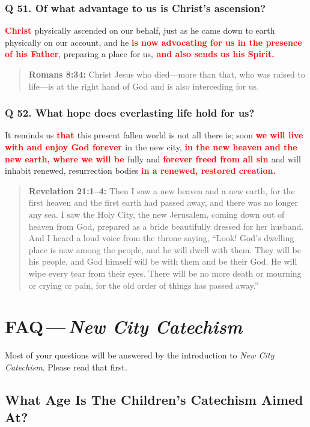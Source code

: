 \documentclass[titlepage]{memoir}
\newcommand\Children[1]{\textbf{\textcolor{red}{#1}}}
\newcommand\Quote[2]{\begin{quote}{\small\textbf{#1:}{ #2}}\end{quote}}
\begin{document}
\subsection{Q 51. Of what advantage to us is Christ's ascension?}
\Children{Christ }physically ascended on our behalf, just as he came down to earth physically on our account, and he \Children{is now advocating for us in the presence of his Father}, preparing a place for us,\Children{ and also sends us his Spirit.}

\Quote{Romans 8:34}{Christ Jesus who died\thinspace{}---\thinspace{}more than that, who was raised to life\thinspace{}---\thinspace{}is at the right hand of God and is also interceding for us.}

\subsection{Q 52. What hope does everlasting life hold for us?}
It reminds us \Children{that }this present fallen world is not all there is; soon \Children{we will live with and enjoy God forever }in the new city, \Children{in the new heaven and the new earth, where we will be }fully and \Children{forever freed from all sin }and will inhabit renewed, resurrection bodies \Children{in a renewed, restored creation.}

\Quote{Revelation 21:1--4}{Then I saw a new heaven and a new earth, for the first heaven and the first earth had passed away, and there was no longer any sea. I saw the Holy City, the new Jerusalem, coming down out of heaven from God, prepared as a bride beautifully dressed for her husband. And I heard a loud voice from the throne saying, ``Look! God's dwelling place is now among the people, and he will dwell with them. They will be his people, and God himself will be with them and be their God. He will wipe every tear from their eyes. There will be no more death or mourning or crying or pain, for the old order of things has passed away.''}


\chapter{FAQ\,---\,{\em New City Catechism}}

Most of your questions will be answered by the introduction to \emph{New City Catechism}. Please read that first.

\section[What Age Is The Children's Catechism Aimed At?][Catechism For What Age Children?]{What Age Is The Children's Catechism Aimed At?}
\end{document}
